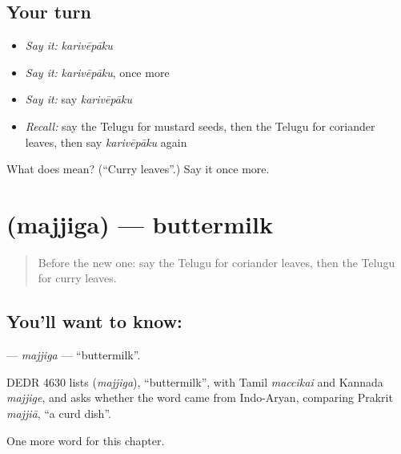 \subsection*{Your turn}
\begin{itemize}
\raggedright
  \item \emph{Say it:} \emph{karivēpāku}
  \item \emph{Say it:} \emph{karivēpāku}, once more
  \item \emph{Say it:} say \emph{karivēpāku}
  \item \emph{Recall:} say the Telugu for mustard seeds, then the Telugu for coriander leaves, then say \emph{karivēpāku} again
\end{itemize}

\begin{tcolorbox}[breakable,colback=teal!4,colframe=teal!35!black,title={Before you move on}]
What does  mean? (\textquotedblleft{}Curry leaves\textquotedblright{}.) Say it once more.
\end{tcolorbox}
\section[\texorpdfstring{\te{మజ్జిగ} (majjiga)}{మజ్జిగ (majjiga)}]{ (majjiga) — buttermilk}

\label{lesson:TE-C299-majjiga}



\begin{quote}
Before the new one: say the Telugu for coriander leaves, then the Telugu for curry leaves.
\end{quote}

\subsection*{You'll want to know: }
\textbf{} — \emph{majjiga} — \textquotedblleft{}buttermilk\textquotedblright{}.

\begin{cousinweb}
DEDR 4630 lists \textbf{} (\emph{majjiga}), \textquotedblleft{}buttermilk\textquotedblright{}, with Tamil \emph{maccikai} and Kannada \emph{majjige}, and asks whether the word came from Indo-Aryan, comparing Prakrit \emph{majjiā}, \textquotedblleft{}a curd dish\textquotedblright{}.
\end{cousinweb}

\begin{grammarlens}[title={What you've built}]
One more word for this chapter.
\end{grammarlens}

